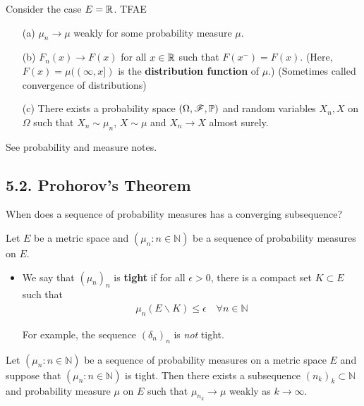 \documentclass[12pt,a4paper]{report}
\newenvironment{proof}
{\begin{changemargin}{1cm}{0.5cm} 
	}%
	{\end{changemargin}
}
\begin{document}
 Consider the case $E =\mathbb{R}$. TFAE
\begin{itemize}
\item[(a)] $\mu_n \rightarrow \mu$ weakly for some probability measure $\mu$.
\item[(b)] $F_n(x) \rightarrow F(x)$ for all $x\in \mathbb{R}$ such that $F(x^-) = F(x)$. (Here, $F(x)  = \mu((\infty,x])$ is the \textbf{distribution function} of $\mu$.) (Sometimes called convergence of distributions)
\item[(c)] There exists a probability space $(\Omega,\mathscr{F}, \mathbb{P})$ and random variables $X_n, X$ on $\Omega$ such that $X_n \sim \mu_n$, $X\sim \mu$ and $X_n \rightarrow X$ almost surely.
\end{itemize}
\begin{proof}
\pf See probability and measure notes.
\end{proof}
\s

\subsection*{5.2. Prohorov's Theorem}

When does a sequence of probability measures has a converging subsequence?
\s

Let $E$ be a metric space and $(\mu_n : n\in \mathbb{N})$ be a sequence of probability measures on $E$.
\begin{itemize}
\item We say that $(\mu_n)_n$ is \textbf{tight} if for all $\epsilon >0$, there is a compact set $K \subset E$ such that
\begin{align*}
\mu_n (E \backslash K) \leq \epsilon \quad \forall n\in \mathbb{N}
\end{align*}
\s

For example, the sequence $(\delta_n)_n$ is \emph{not} tight.
\end{itemize}
\s

 Let $(\mu_n : n\in \mathbb{N})$ be a sequence of probability measures on a metric space $E$ and suppose that $(\mu_n : n\in \mathbb{N})$ is tight. Then there exists a subsequence $(n_k)_k \subset \mathbb{N}$ and probability measure $\mu$ on $E$ such that $\mu_{n_k} \rightarrow \mu$ weakly as $k\rightarrow \infty$.
\s
\end{document}
